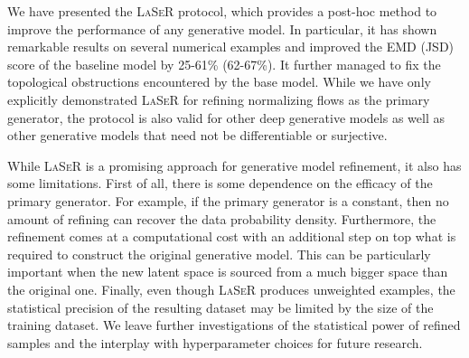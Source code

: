 We have presented the \textsc{LaSeR} protocol, which provides a post-hoc method to improve the performance of any generative model. In particular, it has shown remarkable results on several numerical examples and improved the EMD (JSD) score of the baseline model by 25-61\% (62-67\%). It further managed to fix the topological obstructions encountered by the base model.  While we have only explicitly demonstrated \textsc{LaSeR} for refining normalizing flows as the primary generator, the protocol is also valid for other deep generative models as well as other generative models that need not be differentiable or surjective.

While \textsc{LaSeR} is a promising approach for generative model refinement, it also has some limitations.  First of all, there is some dependence on the efficacy of the primary generator. For example, if the primary generator is a constant, then no amount of refining can recover the data probability density.  Furthermore, the refinement comes at a computational cost with an additional step on top what is required to construct the original generative model.  This can be particularly important when the new latent space is sourced from a much bigger space than the original one.  Finally, even though \textsc{LaSeR} produces unweighted examples, the statistical precision of the resulting dataset may be limited by the size of the training dataset.  We leave further investigations of the statistical power of refined samples and the interplay with hyperparameter choices for future research.


%
